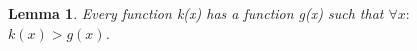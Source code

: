 \begin{comment}
\documentclass[11pt]{article}
\usepackage[a4paper, portrait, margin=1in]{geometry}
\usepackage{graphicx}
\usepackage{hyperref}
\usepackage{caption}
\usepackage[labelformat=simple]{subcaption}    %
\renewcommand{\thesubfigure}{\normalsize Figure \thefigure. (\alph{subfigure}):}
\usepackage{cjhebrew}
\usepackage{float}
\usepackage{eldar_report}
\usepackage{amsmath}
\usepackage{amsfonts}
\newcommand\normx[1]{\Vert#1\Vert}
\usepackage{graphicx}
\usepackage{enumitem}
\usepackage{lifetime}
\usepackage{booktabs}
\usepackage{makecell}
\usepackage{graphicx}
\usepackage{multirow}
\usepackage{comment}
\usepackage{array}
\usepackage[english]{babel}
\usepackage{amsthm}
\usepackage{float}
\newcommand{\Dana}[1]{\textcolor{purple}{\bf Dana: #1}}
\newcommand{\Neta}[1]{\textcolor{purple}{\bf Neta: #1}}


\end{comment}

\newtheorem{theorem}{Theorem}[section]
\newtheorem{lemma}[theorem]{Lemma}
\begin{lemma}\label{lem:functionTheory}
Every function k(x) has a function g(x) such that $\forall{x}:$ $k(x)>g(x)$.
\end{lemma}

